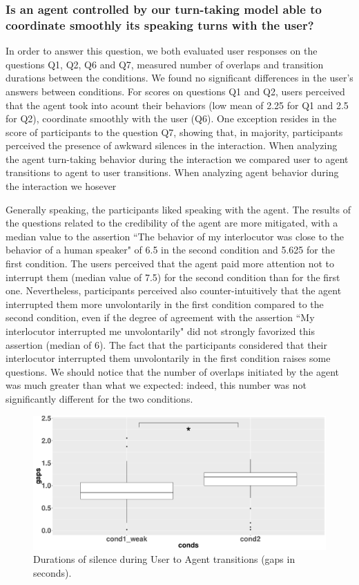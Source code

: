 \subsubsection{Is an agent controlled by our turn-taking model able to coordinate smoothly its speaking turns with the user?}

In order to answer this question, we both evaluated user responses on the questions Q1, Q2, Q6 and Q7, measured number of overlaps and transition durations between the conditions. We found no significant differences in the user's answers between conditions. For scores on questions Q1 and Q2, users perceived that the agent took into acount their behaviors (low mean of 2.25 for Q1 and 2.5 for Q2), coordinate smoothly with the user (Q6). One exception resides in the score of participants to the question Q7, showing that, in majority, participants perceived the presence of awkward silences in the interaction. When analyzing the agent turn-taking behavior during the interaction we compared user to agent transitions to agent to user transitions. 
When analyzing agent behavior during the interaction we hosever 

Generally speaking, the participants liked speaking with the agent. The results of the questions related to the credibility of the agent are more mitigated, with a median value to the assertion ``The behavior of my interlocutor was close to the behavior of a human speaker" of 6.5 in the second condition and 5.625 for the first condition. The users perceived that the agent paid more attention not to interrupt them (median value of 7.5) for the second condition than for the first one. Nevertheless, participants perceived also counter-intuitively that the agent interrupted them more unvolontarily in the first condition compared to the second condition, even if the degree of agreement with the assertion ``My interlocutor interrupted me unvolontarily" did not strongly favorized this assertion (median of 6). 
The fact that the participants considered that their interlocutor interrupted them unvolontarily in the first condition raises some questions. We should notice that the number of overlaps initiated by the agent was much greater than what we expected: indeed, this number was not significantly different for the two conditions.

\begin{figure}
\centering
\includegraphics[width=\linewidth]{figure/boxTransitionsUA.pdf}
\caption{Durations of silence during User to Agent transitions (gaps in seconds).}
\label{box_ua}
\end{figure}

